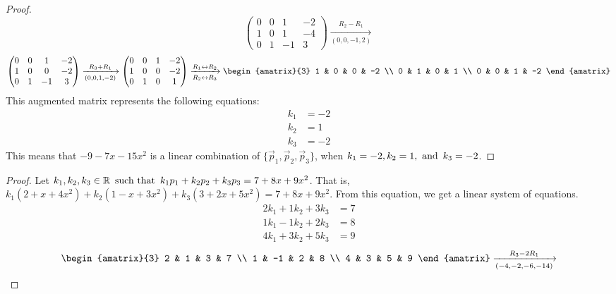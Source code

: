 \begin{enumerate}
\begin{proof}
\[\begin{pmatrix}
        0 & 0 & 1  & -2 \\
        1 & 0 & 1  & -4 \\
        0 & 1 & -1 & 3
      \end{pmatrix} \xrightarrow[(0,0,-1,2)]{R_2 - R_1}
    \]
    \[
      \begin{pmatrix}
        0 & 0 & 1  & -2 \\
        1 & 0 & 0  & -2 \\
        0 & 1 & -1 & 3
      \end{pmatrix} \xrightarrow[(0,0,1,-2)]{R_3 + R_1}
      \begin{pmatrix}
        0 & 0 & 1 & -2 \\
        1 & 0 & 0 & -2 \\
        0 & 1 & 0 & 1
      \end{pmatrix} \xrightarrow[R_2 \leftrightarrow R_3]{R_1 \leftrightarrow R_2}
      \begin{amatrix}{3}
        1 & 0 & 0 & -2 \\
        0 & 1 & 0 & 1 \\
        0 & 0 & 1 & -2
      \end{amatrix}
    \]
    This augmented matrix represents the following equations:
    \begin{align*}
      k_1 & = -2 \\
      k_2 & = 1  \\
      k_3 & = -2
    \end{align*}
    This means that $-9-7x-15x^2$ is a linear combination of $\{\vec{p}_1,\vec{p}_2,\vec{p}_3\}$, when $k_1 = -2, k_2 = 1, \operatorname{~\text{and}~} k_3 = -2$.
  \end{proof}
  \begin{proof}
    Let $k_1,k_2,k_3 \in \mathbb{R} \operatorname{~\text{such that}~} k_1p_1 + k_2p_2 + k_3p_3 = 7+8x+9x^2$. That is, $k_1(2 + x + 4x^2) + k_2(1 - x + 3x^2) + k_3(3 + 2x + 5x^2) = 7+8x+9x^2$. From this equation, we get a linear system of equations.
    \begin{align*}
      2k_1 + 1k_2 + 3k_3 & = 7 \\
      1k_1 - 1k_2 + 2k_3 & = 8 \\
      4k_1 + 3k_2 + 5k_3 & = 9
    \end{align*}
    \[
      \begin{amatrix}{3}
        2 & 1 & 3 & 7 \\
        1 & -1 & 2 & 8 \\
        4 & 3 & 5 & 9
      \end{amatrix} \xrightarrow[(-4,-2,-6,-14)]{R_3 - 2R_1}
\]
\end{proof}
\end{enumerate}
